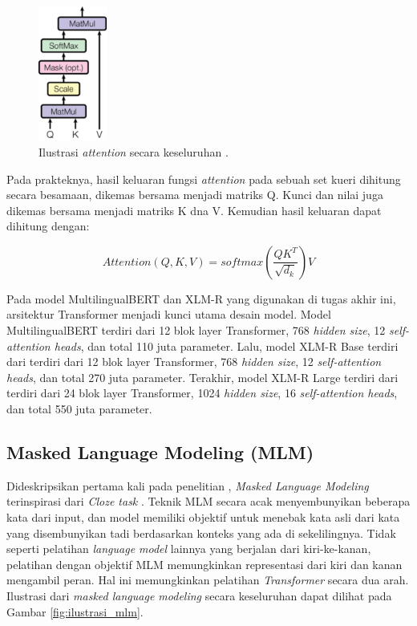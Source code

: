     \begin{figure}[ht]
        \centering
        \includegraphics[width=0.2\textwidth]{resources/overview-attention.png}
        \caption{Ilustrasi \textit{attention} secara keseluruhan \parencite{AttentionVaswani2017}.}
        \label{fig:ilustrasi_attention}
    \end{figure}

    Pada prakteknya, hasil keluaran fungsi \textit{attention} pada sebuah set kueri dihitung secara besamaan, dikemas bersama menjadi matriks Q. Kunci dan nilai juga dikemas bersama menjadi matriks K dna V. Kemudian hasil keluaran dapat dihitung dengan:

    \begin{equation}
        Attention(Q,K,V) = softmax(\frac{QK^{T}}{\sqrt{d_k}})V
    \end{equation}

    Pada model MultilingualBERT dan XLM-R yang digunakan di tugas akhir ini, arsitektur Transformer menjadi kunci utama desain model. Model MultilingualBERT terdiri dari 12 blok layer Transformer, 768 \textit{hidden size}, 12 \textit{self-attention heads}, dan total 110 juta parameter. Lalu, model XLM-R Base terdiri dari terdiri dari 12 blok layer Transformer, 768 \textit{hidden size}, 12 \textit{self-attention heads}, dan total 270 juta parameter. Terakhir, model XLM-R Large terdiri dari terdiri dari 24 blok layer Transformer, 1024 \textit{hidden size}, 16 \textit{self-attention heads}, dan total 550 juta parameter.

    \subsection{Masked Language Modeling (MLM)}
    Dideskripsikan pertama kali pada penelitian \parencite{Devlin_Chang_Lee_Toutanova_2019}, \textit{Masked Language Modeling} terinspirasi dari \textit{Cloze task} \parencite{Taylor_1953}. Teknik MLM secara acak menyembunyikan beberapa kata dari input, dan model memiliki objektif untuk menebak kata asli dari kata yang disembunyikan tadi berdasarkan konteks yang ada di sekelilingnya. Tidak seperti pelatihan \textit{language model} lainnya yang berjalan dari kiri-ke-kanan, pelatihan dengan objektif MLM memungkinkan representasi dari kiri dan kanan mengambil peran. Hal ini memungkinkan pelatihan \textit{Transformer} secara dua arah. Ilustrasi dari \textit{masked language modeling} secara keseluruhan dapat dilihat pada Gambar \ref{fig:ilustrasi_mlm}.

